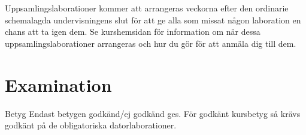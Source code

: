 \documentclass[a4paper]{memoir}
\begin{document}
\begin{Items}


    Uppsamlingslaborationer kommer att arrangeras veckorna efter den ordinarie schemalagda undervisningens slut för att ge alla som missat någon laboration en chans att ta igen dem. Se kurshemsidan för information om när dessa uppsamlingslaborationer arrangeras och hur du gör för att anmäla dig till dem.

\end{Items}


\section*{Examination}


\begin{Items}
    \item[Betyg]
    Endast betygen godkänd/ej godkänd ges. För godkänt kursbetyg så krävs godkänt på de obligatoriska datorlaborationer.
\end{Items}
\end{document}
